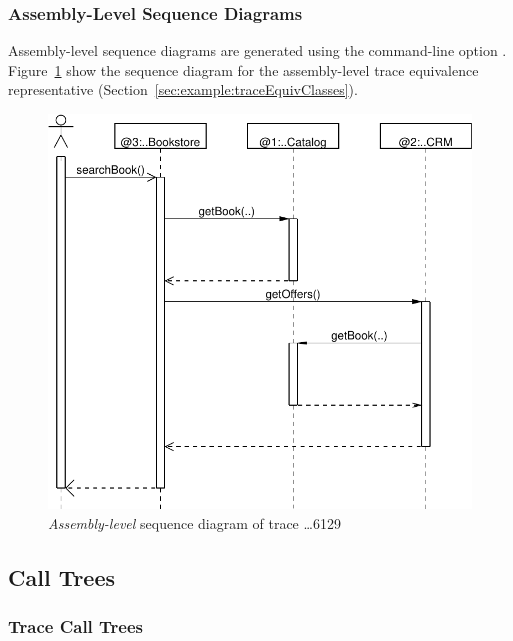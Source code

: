 
\subsubsection{Assembly-Level Sequence Diagrams}\label{sec:example:assemblySeqDiagrams}%

Assembly-level sequence diagrams are generated using the command-line option \OPT{\OPTplotAssemblySequenceDiagrams}. %
Figure~\ref{fig:appendix:traceAnalysisExample:SeqDiagrDepl6129} %
show the sequence diagram for the assembly-level trace equivalence representative %
(Section~\ref{sec:example:traceEquivClasses}).

\begin{figure}[h]\centering
\includegraphics[scale=0.4]{images/example-plots/assemblySequenceDiagram-6488138950668976129-crop}
\caption{\textit{Assembly-level} sequence diagram of trace \ldots{}6129}
\label{fig:appendix:traceAnalysisExample:SeqDiagrDepl6129}
\end{figure}

\subsection{Call Trees}\label{sec:example:callTrees}%

\subsubsection{Trace Call Trees}\label{sec:example:traceCallTrees}%

